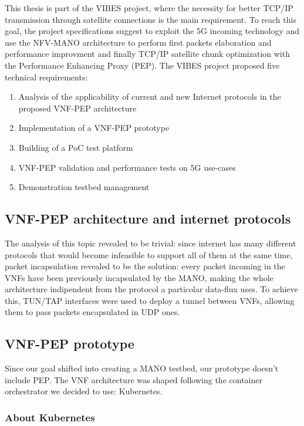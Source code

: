 \documentclass[10pt]{book}
\begin{document}
 This thesis is part of the VIBES project, where the necessity for better TCP/IP 
transmission through satellite connections is the main requirement. To 
reach this goal, the project specifications suggest to exploit the 5G incoming 
technology and use the NFV-MANO architecture to perform first packets 
elaboration and performance improvment and finally TCP/IP satellite chunk
optimization with the Performance Enhancing Proxy (PEP). The VIBES project 
proposed five technical requirements:
\begin{enumerate}
 \item Analysis of the applicability of current and new Internet protocols in
the proposed VNF-PEP architecture
 \item Implementation of a VNF-PEP prototype
 \item Building of a PoC test platform
 \item VNF-PEP validation and performance tests on 5G use-cases
 \item Demonstration testbed management
\end{enumerate}

\subsection{VNF-PEP architecture and internet protocols}

The analysis of this topic revealed to be trivial: since internet has many 
different protocols that would become infeasible to support all of them at the 
same time, packet incapsulation revealed to be the solution: every packet 
incoming in the VNFs have been previously incapsulated by the MANO, making the 
whole architecture indipendent from the protocol a particolar data-flux uses. 
To achieve this, TUN/TAP interfaces were used to deploy 
a tunnel between VNFs, allowing them to pass packets encapsulated in UDP ones.

\subsection{VNF-PEP prototype}

Since our goal shifted into creating a MANO testbed, our prototype doesn't 
include PEP. The VNF architecture was shaped following the container 
orchestrator we decided to use: Kubernetes.

\subsubsection{About Kubernetes}
\end{document}

